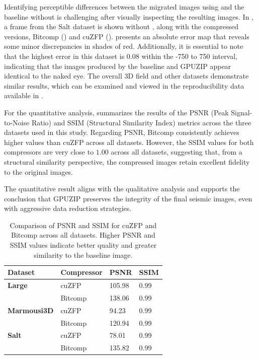 \documentclass[Ingles]{ic-tese-v3}
\begin{document}
Identifying perceptible differences between the migrated images using \compression and the baseline without \compression is challenging after visually inspecting the resulting images. In , a frame from the Salt dataset is shown without \compression, along with the compressed versions, Bitcomp () and cuZFP ().  presents an absolute error map that reveals some minor discrepancies in shades of red. Additionally, it is essential to note that the highest error in this dataset is 0.08 within the -750 to 750 interval, indicating that the images produced by the baseline and GPUZIP appear identical to the naked eye. The overall 3D field and other datasets demonstrate similar results, which can be examined and viewed in the reproducibility data available in \cite{ds}.

For the quantitative analysis,  summarizes the results of the PSNR (Peak Signal-to-Noise Ratio) and SSIM (Structural Similarity Index) metrics across the three datasets used in this study. Regarding PSNR, Bitcomp consistently achieves higher values than cuZFP across all datasets. However, the SSIM values for both compressors are very close to $1.00$ across all datasets, suggesting that, from a structural similarity perspective, the compressed images retain excellent fidelity to the original images.

The quantitative result aligns with the qualitative analysis and supports the conclusion that GPUZIP \compression preserves the integrity of the final seismic images, even with aggressive data reduction strategies.



\begin{table}[h!]
\centering
\begin{tabular}{|l|l|l|l|}
\hline
\rowcolor[HTML]{C0C0C0}
\textbf{Dataset} & \textbf{Compressor} & \textbf{PSNR} & \textbf{SSIM} \\ \hline
\textbf{Large}   & cuZFP      & 105.98  & 0.99  \\ \cline{2-4} 
                 & Bitcomp    & 138.06  & 0.99  \\ \hline
\textbf{Marmousi3D} & cuZFP   & 94.23   & 0.99  \\ \cline{2-4} 
                    & Bitcomp & 120.94  & 0.99  \\ \hline
\textbf{Salt}    & cuZFP      & 78.01   & 0.99  \\ \cline{2-4} 
                 & Bitcomp    & 135.82  & 0.99  \\ \hline
\end{tabular}
\caption[Compression quality assessment]{Comparison of PSNR and SSIM for cuZFP and Bitcomp across all datasets. Higher PSNR and SSIM values indicate better quality and greater similarity to the baseline image.}
\label{tab:quality}
\end{table}
\end{document}
